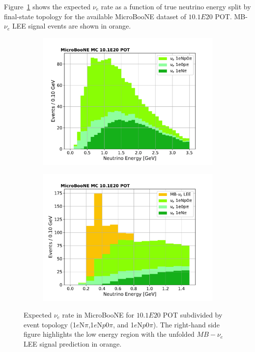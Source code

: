 \documentclass[a4paper]{article}
\begin{document}
\par Figure~\ref{fig:nuerate} shows the expected $\nu_e$ rate as a function of true neutrino energy split by final-state topology for the available MicroBooNE dataset of $10.1E20$ POT. %
 MB-$\nu_e$ LEE signal events are shown in orange.
\begin{figure}[H] 
\begin{center}
    \begin{subfigure}[b]{0.45\textwidth}
    \centering
    \includegraphics[width=1.00\textwidth]{introduction/nue_rate_MCC9.pdf}
    \end{subfigure}
    \begin{subfigure}[b]{0.45\textwidth}
    \centering
    \includegraphics[width=1.00\textwidth]{introduction/nue_rate_MCC9_LEE.pdf}
    \end{subfigure}
\caption{\label{fig:nuerate}Expected $\nu_e$ rate in MicroBooNE for $10.1E20$ POT %
 subdivided by event topology (1$e$N$\pi$,1$e$N$p$0$\pi$, and 1$e$N$p$0$\pi$). The right-hand side figure highlights the low energy region with the unfolded $MB-\nu_e$ LEE signal prediction in orange.}
\end{center}
\end{figure}
\end{document}
